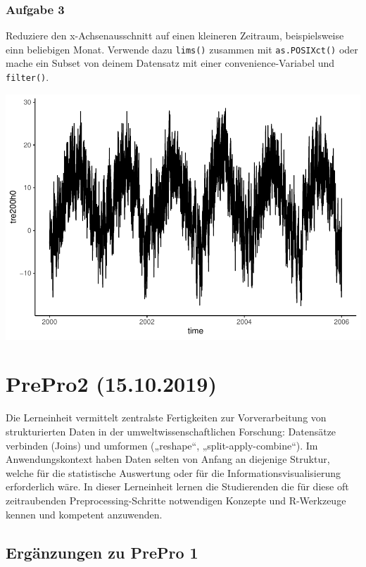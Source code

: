 \documentclass[]{book}
\begin{document}
\hypertarget{aufgabe-3-1}{%
\subsection{Aufgabe 3}\label{aufgabe-3-1}}

Reduziere den x-Achsenausschnitt auf einen kleineren Zeitraum, beispielsweise einn beliebigen Monat. Verwende dazu \texttt{lims()} zusammen mit \texttt{as.POSIXct()} oder mache ein Subset von deinem Datensatz mit einer convenience-Variabel und \texttt{filter()}.

\includegraphics{_main_files/figure-latex/unnamed-chunk-55-1.pdf}

\hypertarget{prepro2-15.10.2019}{%
\chapter{PrePro2 (15.10.2019)}\label{prepro2-15.10.2019}}

Die Lerneinheit vermittelt zentralste Fertigkeiten zur Vorverarbeitung von strukturierten Daten in der umweltwissenschaftlichen Forschung: Datensätze verbinden (Joins) und umformen („reshape``, „split-apply-combine``). Im Anwendungskontext haben Daten selten von Anfang an diejenige Struktur, welche für die statistische Auswertung oder für die Informationsvisualisierung erforderlich wäre. In dieser Lerneinheit lernen die Studierenden die für diese oft zeitraubenden Preprocessing-Schritte notwendigen Konzepte und R-Werkzeuge kennen und kompetent anzuwenden.

\hypertarget{erganzungen-zu-prepro-1}{%
\section{Ergänzungen zu PrePro 1}\label{erganzungen-zu-prepro-1}}
\end{document}
